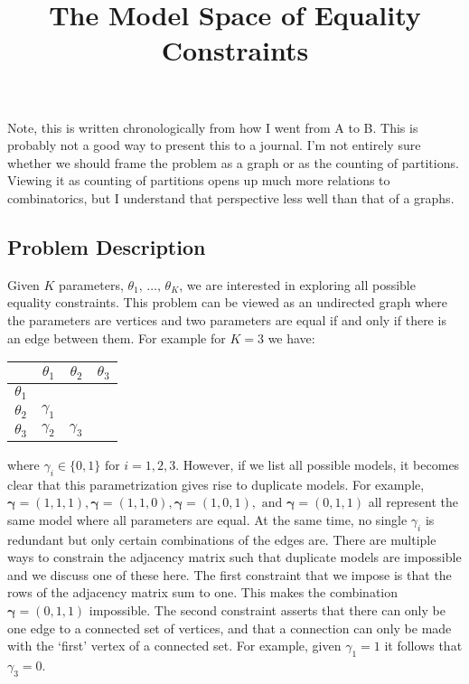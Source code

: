 \documentclass[]{article}
\title{The Model Space of Equality Constraints}
\author{}
\date{}
\newcommand{\bindicator}{\gamma}%
\begin{document}
\maketitle

Note, this is written chronologically from how I went from A to B. This is probably not a good way to present this to a journal.
I'm not entirely sure whether we should frame the problem as a graph or as the counting of partitions.
Viewing it as counting of partitions opens up much more relations to combinatorics, but I understand that perspective less well than that of a graphs.

\subsection*{Problem Description}
Given $K$ parameters, $\theta_1,\, \dots,\, \theta_K$, we are interested in exploring all possible equality constraints.
This problem can be viewed as an undirected graph where the parameters are vertices and two parameters are equal if and only if there is an edge between them.
For example for $K = 3$ we have:
\begin{table}[!ht]
	\centering
	\begin{tabular}{l|rrr}
					&	$\theta_1$	&	$\theta_2$	&	$\theta_3$	\\
		\hline
		$\theta_1$	&				&				&				\\
		$\theta_2$	&	$\bindicator_1$	&				&				\\
		$\theta_3$	&	$\bindicator_2$	&	$\bindicator_3$	&				\\
	\end{tabular}
\end{table}

where $\bindicator_i \in \{0, 1\} \text{ for } i=1, 2, 3$.
However, if we list all possible models, it becomes clear that this parametrization gives rise to duplicate models.
For example, $\bm{\bindicator} = (1, 1, 1), \bm{\bindicator} = (1, 1, 0), \bm{\bindicator} = (1, 0, 1), \text{ and } \bm{\bindicator} = (0, 1, 1)$ all represent the same model where all parameters are equal.
At the same time, no single $\bindicator_i$ is redundant but only certain combinations of the edges are.
There are multiple ways to constrain the adjacency matrix such that duplicate models are impossible and we discuss one of these here.
The first constraint that we impose is that the rows of the adjacency matrix sum to one.
This makes the combination $\bm{\bindicator} = (0, 1, 1)$ impossible. 
The second constraint asserts that there can only be one edge to a connected set of vertices, and that a connection can only be made with the `first' vertex of a connected set.
For example, given $\bindicator_1 = 1$ it follows that $\bindicator_3 = 0$.
\end{document}
